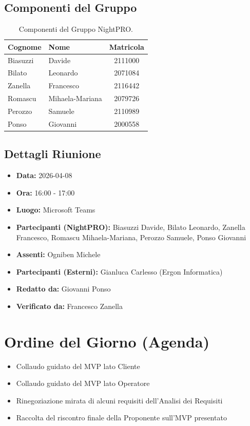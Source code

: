 \documentclass[a4paper, 11pt, oneside]{scrartcl}
\begin{document}
\subsection{Componenti del Gruppo}
\begin{table}[h!]
\centering
\begin{tabular}{@{}llc@{}}
\toprule
\textbf{Cognome} & \textbf{Nome} & \textbf{Matricola} \\
\midrule
Biasuzzi & Davide & 2111000 \\
Bilato & Leonardo & 2071084 \\
Zanella & Francesco & 2116442 \\
Romascu & Mihaela-Mariana & 2079726 \\
Perozzo & Samuele & 2110989 \\
Ponso & Giovanni & 2000558 \\
\bottomrule
\end{tabular}
\caption{Componenti del Gruppo NightPRO.}
\end{table}

\subsection{Dettagli Riunione}
\begin{itemize}
	\item \textbf{Data:} 2026-04-08
	\item \textbf{Ora:} 16:00 - 17:00
	\item \textbf{Luogo:} Microsoft Teams
	\item \textbf{Partecipanti (NightPRO):} Biasuzzi Davide, Bilato Leonardo, Zanella Francesco, Romascu Mihaela-Mariana, Perozzo Samuele, Ponso Giovanni
	\item \textbf{Assenti:} Ogniben Michele
	\item \textbf{Partecipanti (Esterni):} Gianluca Carlesso (Ergon Informatica)
	\item \textbf{Redatto da:} Giovanni Ponso
	\item \textbf{Verificato da:} Francesco Zanella
\end{itemize}

\newpage
\section{Ordine del Giorno (Agenda)}
\begin{itemize}
	\item[1.] Collaudo guidato del MVP lato Cliente
	\item[2.] Collaudo guidato del MVP lato Operatore
	\item[3.] Rinegoziazione mirata di alcuni requisiti dell'Analisi dei Requisiti
	\item[4.] Raccolta del riscontro finale della Proponente sull'MVP presentato
\end{itemize}
\end{document}
